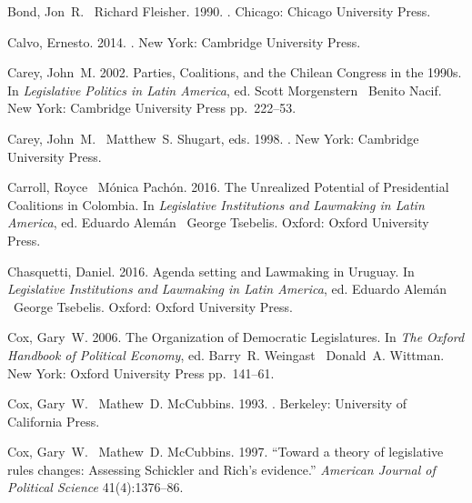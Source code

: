 \documentclass[letter,12pt]{article}
\begin{document}
\begin{thebibliography}{xx}
Bond, Jon~R. \harvardand\ Richard Fleisher. 1990.
.
\newblock Chicago:  Chicago University Press.

Calvo, Ernesto. 2014.
.
\newblock New York:  Cambridge University Press.

Carey, John~M. 2002.
\newblock Parties, Coalitions, and the {Chilean} Congress in the 1990s.  In
  {\em Legislative Politics in Latin America}, ed. Scott Morgenstern
  \harvardand\ Benito Nacif.
\newblock New York:  Cambridge University Press pp.~222--53.

Carey, John~M. \harvardand\ Matthew~S. Shugart, eds. 1998.
.
\newblock New York:  Cambridge University Press.

Carroll, Royce \harvardand\ M\'onica Pach\'on. 2016.
\newblock The Unrealized Potential of Presidential Coalitions in Colombia.  In
  {\em Legislative Institutions and Lawmaking in Latin America}, ed. Eduardo
  Alem\'an \harvardand\ George Tsebelis.
\newblock Oxford:  Oxford University Press.

Chasquetti, Daniel. 2016.
\newblock Agenda setting and Lawmaking in Uruguay.  In {\em Legislative
  Institutions and Lawmaking in Latin America}, ed. Eduardo Alem\'an
  \harvardand\ George Tsebelis.
\newblock Oxford:  Oxford University Press.

Cox, Gary~W. 2006.
\newblock The Organization of Democratic Legislatures.  In {\em The Oxford
  Handbook of Political Economy}, ed. Barry~R. Weingast \harvardand\ Donald~A.
  Wittman.
\newblock New York:  Oxford University Press pp.~141--61.

Cox, Gary~W. \harvardand\ Mathew~D. McCubbins. 1993.
.
\newblock Berkeley:  University of California Press.

Cox, Gary~W. \harvardand\ Mathew~D. McCubbins. 1997.
\newblock ``Toward a theory of legislative rules changes: Assessing {S}chickler
  and {R}ich's evidence.'' {\em American Journal of Political Science}
  41(4):1376--86.


\end{thebibliography}
\end{document}
